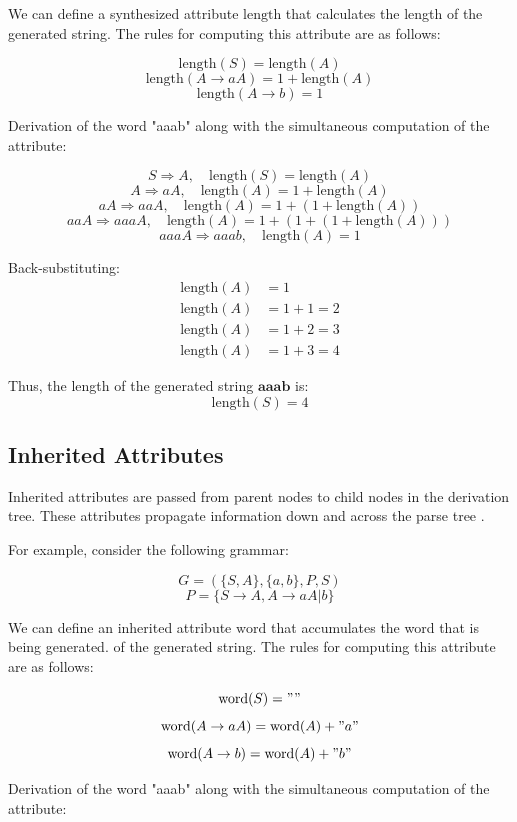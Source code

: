 We can define a synthesized attribute \( \text{length} \) that calculates the length of the generated string. The rules for computing this attribute are as follows:
  
  
\[  \text{length}(S) = \text{length}(A) \]
\[  \text{length}(A \rightarrow aA) = 1 + \text{length}(A) \]
\[ \text{length}(A \rightarrow b) = 1 \]

Derivation of the word "aaab" along with the simultaneous computation of the attribute:

\[S \Rightarrow A , \quad \text{length}(S) = \text{length}(A)\] 
\[ A \Rightarrow aA , \quad \text{length}(A) = 1 + \text{length}(A)  \]
\[  aA \Rightarrow aaA , \quad \text{length}(A) = 1 + (1 + \text{length}(A))  \]
\[  aaA \Rightarrow aaaA , \quad \text{length}(A) = 1 + (1 + (1 + \text{length}(A)))  \]
\[  aaaA \Rightarrow aaab , \quad \text{length}(A) = 1  \]


Back-substituting:
\[
\begin{aligned}
\text{length}(A) &= 1 \\
\text{length}(A) &= 1 + 1 = 2 \\
\text{length}(A) &= 1 + 2 = 3 \\
\text{length}(A) &= 1 + 3 = 4
\end{aligned}
\]

Thus, the length of the generated string \( \mathbf{aaab} \) is:
\[
\text{length}(S) = 4
\]
  
\subsection{Inherited Attributes}

Inherited attributes are passed from parent nodes to child nodes in the derivation tree. These attributes propagate information down and across the parse tree \cite{cit5}.

For example, consider the following grammar:

\[ G = ( \{S, A\}, \{a, b\}, P, S ) \]
\[ P = \{ S \rightarrow A, A \rightarrow aA | b \} \]

We can define an inherited attribute \( \text{word} \) that accumulates the word that is being generated. of the generated string. The rules for computing this attribute are as follows:

\[ \text{word}(S) = "" \]
\[ \text{word}(A \rightarrow aA) = \text{word}(A) + "a" \]
\[ \text{word}(A \rightarrow b) = \text{word}(A) + "b" \]

Derivation of the word "aaab" along with the simultaneous computation of the attribute:

